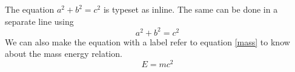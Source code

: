\documentclass{article}
\begin{document}
The equation $a^2 + b^2 = c^2$ is typeset as inline. The same can be done in a separate line using
\begin{equation}
  a^2 + b^2 = c^2
\end{equation}
We can also make the equation with a label refer to equation \eqref{mass} to know about the mass energy relation.
\begin{equation}
  E = mc^2 \label{mass}
\end{equation}
\end{document}
